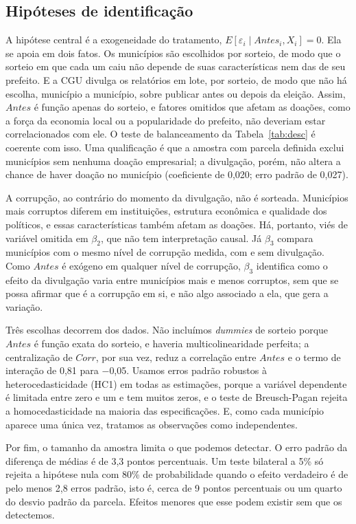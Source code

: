 \subsection{Hipóteses de identificação}

A hipótese central é a exogeneidade do tratamento, $E[\varepsilon_i\mid \mathit{Antes}_i,X_i]=0$. Ela se
apoia em dois fatos. Os municípios são escolhidos por sorteio, de modo que o sorteio em que cada um caiu
não depende de suas características nem das de seu prefeito. E a CGU divulga os relatórios em lote, por
sorteio, de modo que não há escolha, município a município, sobre publicar antes ou depois da eleição.
Assim, $\mathit{Antes}$ é função apenas do sorteio, e fatores omitidos que afetam as doações, como a força
da economia local ou a popularidade do prefeito, não deveriam estar correlacionados com ele. O teste de
balanceamento da Tabela~\ref{tab:desc} é coerente com isso. Uma qualificação é que a amostra com parcela
definida exclui municípios sem nenhuma doação empresarial; a divulgação, porém, não altera a chance de
haver doação no município (coeficiente de 0,020; erro padrão de 0,027).

A corrupção, ao contrário do momento da divulgação, não é sorteada. Municípios mais corruptos diferem em
instituições, estrutura econômica e qualidade dos políticos, e essas características também afetam as
doações. Há, portanto, viés de variável omitida em $\beta_2$, que não tem interpretação causal. Já
$\beta_3$ compara municípios com o mesmo nível de corrupção medida, com e sem divulgação. Como
$\mathit{Antes}$ é exógeno em qualquer nível de corrupção, $\beta_3$ identifica como o efeito da divulgação
varia entre municípios mais e menos corruptos, sem que se possa afirmar que é a corrupção em si, e não
algo associado a ela, que gera a variação.

Três escolhas decorrem dos dados. Não incluímos \textit{dummies} de sorteio porque $\mathit{Antes}$ é
função exata do sorteio, e haveria multicolinearidade perfeita; a centralização de $\mathit{Corr}$, por
sua vez, reduz a correlação entre $\mathit{Antes}$ e o termo de interação de 0,81 para $-$0,05. Usamos
erros padrão robustos à heterocedasticidade (HC1) em todas as estimações, porque a variável dependente é
limitada entre zero e um e tem muitos zeros, e o teste de Breusch-Pagan rejeita a homocedasticidade na
maioria das especificações. E, como cada município aparece uma única vez, tratamos as observações como
independentes.

Por fim, o tamanho da amostra limita o que podemos detectar. O erro padrão da diferença de médias é de
3,3 pontos percentuais. Um teste bilateral a 5\% só rejeita a hipótese nula com 80\% de probabilidade
quando o efeito verdadeiro é de pelo menos 2,8 erros padrão, isto é, cerca de 9 pontos percentuais ou um
quarto do desvio padrão da parcela. Efeitos menores que esse podem existir sem que os detectemos.

